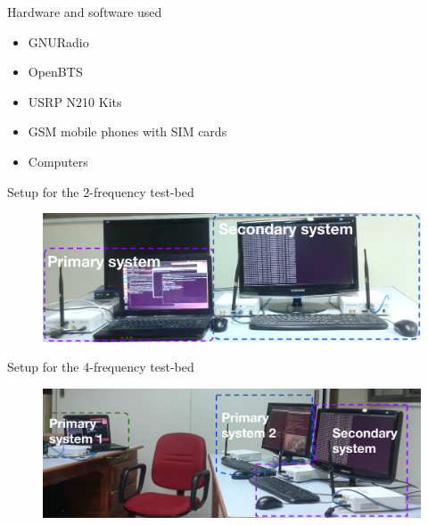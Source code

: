 \documentclass{beamer}
\begin{document}
	\begin{frame}{Hardware and software used}
    \begin{itemize}
      \item GNURadio
      \item OpenBTS
      \item USRP N210  Kits
      \item GSM mobile phones with SIM cards
      \item Computers
    \end{itemize}
  \end{frame}

  \begin{frame}{Setup for the 2-frequency test-bed}
    \begin{figure}
      \centering
      \includegraphics[width=\linewidth]{img/freq2}
    \end{figure}
  \end{frame}
  
  \begin{frame}{Setup for the 4-frequency test-bed}
    \begin{figure}
      \centering
      \includegraphics[width=\linewidth]{img/freq4}
    \end{figure}
  \end{frame}
    
\end{document}
